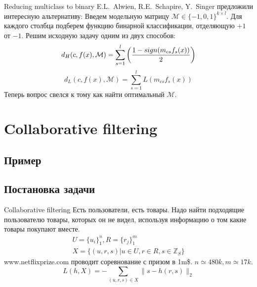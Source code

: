\documentclass[14pt, fleqn, xcolor={dvipsnames, table}]{beamer}
\begin{document}
\begin{frame}{Reducing multiclass to binary}
\small
E.L.~Alwien, R.E.~Schapire, Y.~Singer предложили интересную альтернативу:
Введем модельную матрицу $\mathcal{M} \in \{-1,0,1\}^{k\times l}$. Для каждого столбца подберем функцию бинарной классификации, отделяющую $+1$ от $-1$.
Решим исходную задачу одним из двух способов:
$$
d_H(c, f(x), \mathcal{M}) = \sum_{s = 1}^l\left({1 - sign(m_{cs} f_s(x)) \over 2}\right)
$$
$$
d_L(c, f(x), \mathcal{M}) = \sum_{s = 1}^l L(m_{cs} f_s(x))
$$
Теперь вопрос свелся к тому как найти оптимальный $\mathcal{M}$.
\end{frame}

\section{Collaborative filtering}

\subsection{Пример}

\subsection{Постановка задачи} %
\begin{frame}{Collaborative filtering}
Есть пользователи, есть товары. Надо найти подходящие пользователю товары, которых он не видел, используя информацию о том какие товары покупают вместе.
$$\begin{array}{l}
U = \{u_i\}_1^n, R = \{r_j\}_1^m \\
X = \{(u, r, s) | u \in U, r \in R, s \in \mathbb{Z}_S \}
\end{array}$$
{\color{blue}www.netflixprize.com} проводит соревнование с призом в 1m\$. $n \simeq 480k, m \simeq 17k$.
$$
L(h, X) = -\sum_{(u,r,s) \in X} \|s - h(r,s)\|_2
$$
\end{frame}
\end{document}
